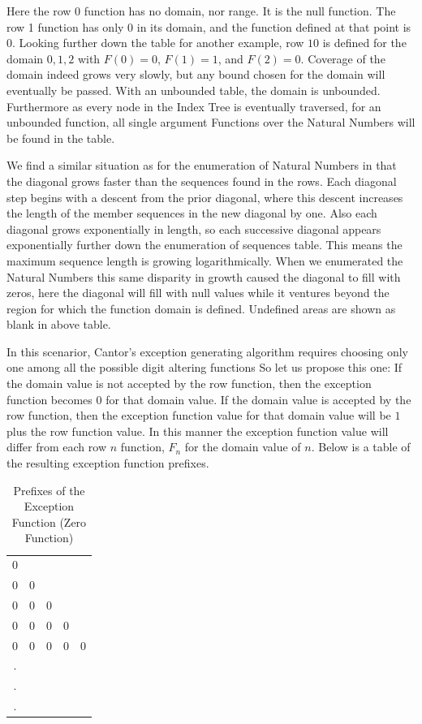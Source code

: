 \documentclass{article}
\begin{document}
 	Here the row \(0\) function has no domain, nor range.  It is the null function.  The row 1 function has only \(0\) in its domain, and the function defined at that point is \(0\). Looking further down the table for another example, row \(10\) is defined for the domain \({0, 1, 2}\) with \(F(0)=0\), \(F(1)=1\), and \(F(2)=0\).  Coverage of the domain indeed grows very slowly, but any bound chosen for the domain will eventually be passed.  With an unbounded table, the domain is unbounded.  Furthermore as every node in the Index Tree is eventually traversed, for an unbounded function, all single argument Functions over the Natural Numbers will be found in the table.
 	
 	We find a similar situation as for the enumeration of Natural Numbers in that the diagonal grows faster than the sequences found in the rows. Each diagonal step begins with a descent from the prior diagonal, where this descent increases the length of the member sequences in the new diagonal by one. Also each diagonal grows exponentially in length, so each successive diagonal appears exponentially further down the enumeration of sequences table. This means the maximum sequence length is growing logarithmically.  When we enumerated the Natural Numbers this same disparity in growth caused the diagonal to fill with zeros, here the diagonal will fill with null values while it ventures beyond the region for which the function domain is defined. Undefined areas are shown as blank in above table.
 	
 	In this scenarior, Cantor's exception generating algorithm requires choosing only one among all the possible digit altering functions  So let us propose this one:  If the domain value is not accepted by the row function, then the exception function becomes 0 for that domain value. If the domain value is accepted by the row function, then the exception function value for that domain value will be \(1\) plus the row function value.  In this manner the exception function value will differ from each row \(n\) function, \(F_n\) for the domain value of \(n\).  Below is a table of the resulting exception function prefixes.
 	
 	\begin{table}[H]
 		\centering
 		\begin{tabular}{c c c c c}
 			0 \\
 			0 & 0 \\
 			0 & 0 & 0 \\
 			0 & 0 & 0 & 0 \\
 			0 & 0 & 0 & 0 & 0 \\
 			.\\
 			.\\
 			.\\
 		\end{tabular}
 		\caption{Prefixes of the Exception Function (Zero Function)}
 		\label{tab:exception_prefixes}
 	\end{table}
 	
\end{document}
